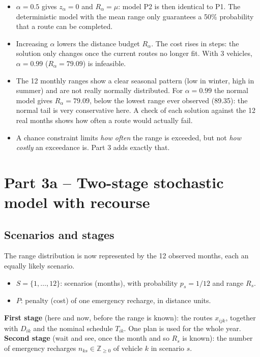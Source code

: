 \documentclass[11pt,a4paper]{article}
\theoremstyle{definition}
\newcommand{\Z}{\mathbb{Z}}
\begin{document}
\begin{notebox}
\begin{itemize}
\item $\alpha=0.5$ gives $z_\alpha=0$ and $R_\alpha=\mu$: model P2 is then identical to P1. The deterministic model with the mean range only guarantees a 50\% probability that a route can be completed.
\item Increasing $\alpha$ lowers the distance budget $R_\alpha$. The cost rises in steps: the solution only changes once the current routes no longer fit. With 3 vehicles, $\alpha=0.99$ ($R_\alpha=79.09$) is infeasible.
\item The 12 monthly ranges show a clear seasonal pattern (low in winter, high in summer) and are not really normally distributed. For $\alpha=0.99$ the normal model gives $R_\alpha=79.09$, below the lowest range ever observed (89.35): the normal tail is very conservative here. A check of each solution against the 12 real months shows how often a route would actually fail.
\item A chance constraint limits \emph{how often} the range is exceeded, but not \emph{how costly} an exceedance is. Part 3 adds exactly that.
\end{itemize}
\end{notebox}

\section{Part 3a -- Two-stage stochastic model with recourse}
\subsection{Scenarios and stages}
The range distribution is now represented by the 12 observed months, each an equally likely scenario.
\begin{itemize}
\item $S=\{1,\dots,12\}$: scenarios (months), with probability $p_s=1/12$ and range $R_s$.
\item $P$: penalty (cost) of one emergency recharge, in distance units.
\end{itemize}
\textbf{First stage} (here and now, before the range is known): the routes $x_{ijk}$, together with $D_{ik}$ and the nominal schedule $T_{ik}$. One plan is used for the whole year.\\
\textbf{Second stage} (wait and see, once the month and so $R_s$ is known): the number of emergency recharges $n_{ks}\in\Z_{\ge0}$ of vehicle $k$ in scenario $s$.
\end{document}
